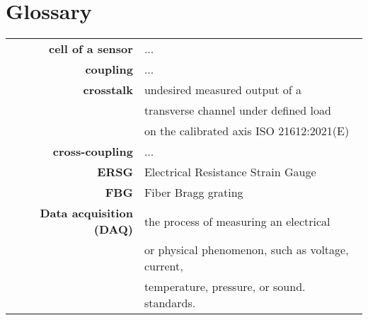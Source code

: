 \chapter{Glossary}
\label{chapter:glossaries}

\begin{tabular}{>{\bfseries}r l}
    cell of a sensor & ...\\
    coupling & ... \\
    crosstalk & undesired measured output of a\\
     &transverse channel under defined load \\
     &on the calibrated axis ISO 21612:2021(E) \\
    cross-coupling & ... \\
    
    ERSG & Electrical Resistance Strain Gauge\\
    FBG & Fiber Bragg grating\\
    Data acquisition (DAQ) & the process of measuring an electrical\\
    & or physical phenomenon, such as voltage, current, \\
    & temperature, pressure, or sound. 
standards.
\end{tabular}




